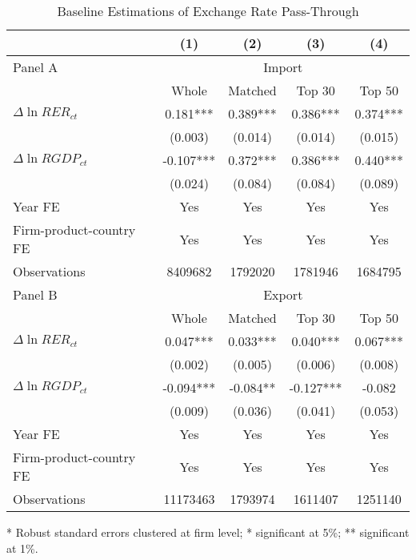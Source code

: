 \begin{table}[htbp]
	\centering
	\caption{Baseline Estimations of Exchange Rate Pass-Through}
	
	\begin{threeparttable}
	\begin{tabular}{lcccc}
		\toprule
		& (1)   & (2)   & (3)   & (4) \\
		\midrule
		Panel A &\multicolumn{4}{c}{Import} \\
		& Whole & Matched & Top 30 & Top 50 \\
		\midrule
		$\Delta \ln RER_{ct}$ & 0.181*** & 0.389*** & 0.386*** & 0.374*** \\
		& (0.003) & (0.014) & (0.014) & (0.015) \\
		$\Delta \ln RGDP_{ct}$ & -0.107*** & 0.372*** & 0.386*** & 0.440*** \\
		& (0.024) & (0.084) & (0.084) & (0.089) \\
		Year FE  & Yes   & Yes   & Yes   & Yes \\
		Firm-product-country FE & Yes   & Yes   & Yes   & Yes \\
		Observations & 8409682 & 1792020 & 1781946 & 1684795 \\
		\midrule
		Panel B &\multicolumn{4}{c}{Export} \\
		& Whole & Matched & Top 30 & Top 50 \\
		\midrule
		$\Delta \ln RER_{ct}$ & 0.047*** & 0.033*** & 0.040*** & 0.067*** \\
		& (0.002) & (0.005) & (0.006) & (0.008) \\
		$\Delta \ln RGDP_{ct}$ & -0.094*** & -0.084** & -0.127*** & -0.082 \\
		& (0.009) & (0.036) & (0.041) & (0.053) \\
		Year FE  & Yes   & Yes   & Yes   & Yes \\
		Firm-product-country FE & Yes   & Yes   & Yes   & Yes \\
		Observations & 11173463 & 1793974 & 1611407 & 1251140 \\
		\bottomrule
	\end{tabular}
	\begin{tablenotes}
		\footnotesize
		\item[*] Robust standard errors clustered at firm level; * significant at 5\%; ** significant at 1\%.
	\end{tablenotes}
	\end{threeparttable}
	\label{tab5.1}
\end{table}

